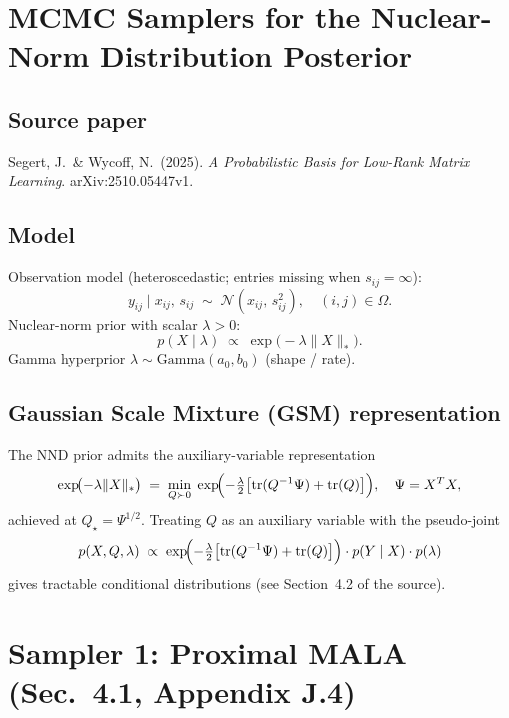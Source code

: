 
\section*{MCMC Samplers for the Nuclear-Norm Distribution Posterior}

\subsection*{Source paper}
Segert, J.\ \& Wycoff, N.\ (2025).
\emph{A Probabilistic Basis for Low-Rank Matrix Learning}.
arXiv:2510.05447v1.

\subsection*{Model}
Observation model (heteroscedastic; entries missing when $s_{ij}=\infty$):
\[
  y_{ij} \mid x_{ij},\, s_{ij}
  \;\sim\; \mathcal{N}(x_{ij},\, s_{ij}^2), \quad (i,j)\in\Omega.
\]
Nuclear-norm prior with scalar $\lambda>0$:
\[
  p(X \mid \lambda) \;\propto\; \exp\!\bigl(-\lambda\|X\|_*\bigr).
\]
Gamma hyperprior $\lambda\sim\mathrm{Gamma}(a_0,b_0)$ (shape / rate).

\subsection*{Gaussian Scale Mixture (GSM) representation}
The NND prior admits the auxiliary-variable representation
\[
  \exp\!\bigl(-\lambda\|X\|_*\bigr)
  \;=\;
  \min_{Q\succ 0}\;\exp\!\Bigl(-\tfrac{\lambda}{2}\bigl[
    \operatorname{tr}(Q^{-1}\Psi) + \operatorname{tr}(Q)\bigr]\Bigr),
  \quad
  \Psi = X^T X,
\]
achieved at $Q_\star = \Psi^{1/2}$.
Treating $Q$ as an auxiliary variable with the pseudo-joint
\[
  p(X,Q,\lambda)
  \;\propto\;
  \exp\!\Bigl(-\tfrac{\lambda}{2}\bigl[\operatorname{tr}(Q^{-1}\Psi)+\operatorname{tr}(Q)\bigr]\Bigr)
  \cdot p(Y\mid X) \cdot p(\lambda)
\]
gives tractable conditional distributions (see Section~4.2 of the source).


\section*{Sampler 1: Proximal MALA (Sec.\ 4.1, Appendix J.4)}

